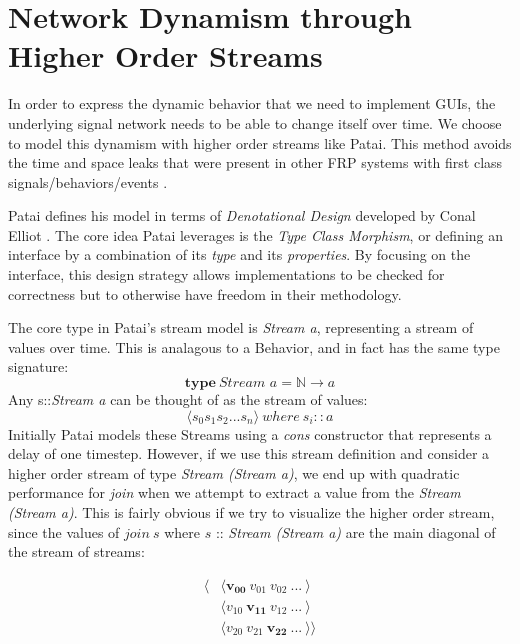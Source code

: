 \documentclass[twocolumn,11pt,english]{article}
\begin{document}
\section{Network Dynamism through Higher Order Streams}
In order to express the dynamic behavior that we need to implement GUIs, the underlying signal network needs to be able to change itself over time. We choose to model this dynamism with higher order streams like Patai\cite{HighOrderStreams}. This method avoids the time and space leaks that were present in other FRP systems with first class signals/behaviors/events \cite{ElliottHudak97:Fran}. 

Patai defines his model in terms of \textit{Denotational Design} developed by Conal Elliot \cite{elliott2009denotational}. The core idea Patai leverages is the \textit{Type Class Morphism}, or defining an interface by a combination of its \textit{type} and its \textit{properties}. By focusing on the interface, this design strategy allows implementations to be checked for correctness but to otherwise have freedom in their methodology. 

The core type in Patai's stream model is \textit{Stream a}, representing a stream of values over time. This is analagous to a Behavior, and in fact has the same type signature: 
\begin{equation}
  \textbf{type}~\textit{Stream a} = \mathbb{N} \rightarrow a
\end{equation}
Any  s::\textit{Stream a} can be thought of as the stream of values:
\begin{equation}
  \langle s_0 s_1 s_2 ... s_n \rangle ~where~ s_i :: a
\end{equation}
Initially Patai models these Streams using a \textit{cons} constructor that represents a delay of one timestep. However, if we use this stream definition and consider a higher order stream of type \textit{Stream (Stream a)}, we end up with quadratic performance for \textit{join} when we attempt to extract a value from the \textit{Stream (Stream a)}. This is fairly obvious if we try to visualize the higher order stream, since the values of $join~s$ where $s$ :: \textit{Stream (Stream a)} are the main diagonal of the stream of streams:

\begin{align*}
    \langle &\langle \mathbf{v_{00}} ~ v_{01} ~ v_{02} ~ ... ~ \rangle \\
    &\langle v_{10} ~ \mathbf{v_{11}} ~ v_{12} ~ ... ~ \rangle \\
    &\langle v_{20} ~ v_{21} ~ \mathbf{v_{22}} ~  ...  ~ \rangle \rangle
\end{align*}
\end{document}
